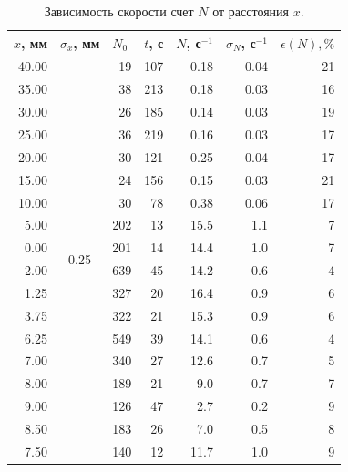\documentclass{article}
\begin{document}
\begin{table}[h!]
\centering
\begin{tabular}{|r|c|r|r|r|r|r|}
\hline
\multicolumn{1}{|l|}{$x$, мм} &
  \multicolumn{1}{l|}{$\sigma_x$, мм} &
  \multicolumn{1}{l|}{$N_0$} &
  \multicolumn{1}{l|}{$t$, с} &
  \multicolumn{1}{l|}{$N$, с$^{-1}$} &
  \multicolumn{1}{l|}{$\sigma_{N}$, с$^{-1}$} &
  \multicolumn{1}{l|}{$\epsilon(N),   \%$} \\ \hline
40.00 & \multirow{18}{*}{0.25} & 19  & 107 & 0.18 & 0.04 & 21 \\ \cline{1-1} \cline{3-7} 
35.00 &                        & 38  & 213 & 0.18 & 0.03 & 16 \\ \cline{1-1} \cline{3-7} 
30.00 &                        & 26  & 185 & 0.14 & 0.03 & 19 \\ \cline{1-1} \cline{3-7} 
25.00 &                        & 36  & 219 & 0.16 & 0.03 & 17 \\ \cline{1-1} \cline{3-7} 
20.00 &                        & 30  & 121 & 0.25 & 0.04 & 17 \\ \cline{1-1} \cline{3-7} 
15.00 &                        & 24  & 156 & 0.15 & 0.03 & 21 \\ \cline{1-1} \cline{3-7} 
10.00 &                        & 30  & 78  & 0.38 & 0.06 & 17 \\ \cline{1-1} \cline{3-7} 
5.00  &                        & 202 & 13  & 15.5 & 1.1  & 7  \\ \cline{1-1} \cline{3-7} 
0.00  &                        & 201 & 14  & 14.4 & 1.0  & 7  \\ \cline{1-1} \cline{3-7} 
2.00  &                        & 639 & 45  & 14.2 & 0.6  & 4  \\ \cline{1-1} \cline{3-7} 
1.25  &                        & 327 & 20  & 16.4 & 0.9  & 6  \\ \cline{1-1} \cline{3-7} 
3.75  &                        & 322 & 21  & 15.3 & 0.9  & 6  \\ \cline{1-1} \cline{3-7} 
6.25  &                        & 549 & 39  & 14.1 & 0.6  & 4  \\ \cline{1-1} \cline{3-7} 
7.00  &                        & 340 & 27  & 12.6 & 0.7  & 5  \\ \cline{1-1} \cline{3-7} 
8.00  &                        & 189 & 21  & 9.0    & 0.7  & 7  \\ \cline{1-1} \cline{3-7} 
9.00  &                        & 126 & 47  & 2.7  & 0.2  & 9  \\ \cline{1-1} \cline{3-7} 
8.50  &                        & 183 & 26  & 7.0    & 0.5  & 8  \\ \cline{1-1} \cline{3-7} 
7.50  &                        & 140 & 12  & 11.7 & 1.0  & 9  \\ \hline
\end{tabular}
\caption{Зависимость скорости счет $N$ от расстояния $x$.}
\label{tab:1}
\end{table}
  
\end{document}
